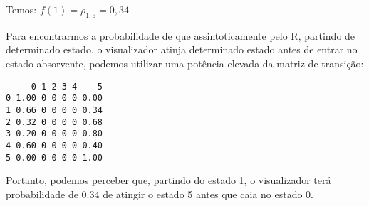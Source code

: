 \documentclass[
]{article}
\newenvironment{Shaded}{\begin{snugshade}}{\end{snugshade}}
\newcommand{\DecValTok}[1]{\textcolor[rgb]{0.00,0.00,0.81}{#1}}
\newcommand{\KeywordTok}[1]{\textcolor[rgb]{0.13,0.29,0.53}{\textbf{#1}}}
\newcommand{\NormalTok}[1]{#1}
\newcommand{\OperatorTok}[1]{\textcolor[rgb]{0.81,0.36,0.00}{\textbf{#1}}}
\newcommand{\StringTok}[1]{\textcolor[rgb]{0.31,0.60,0.02}{#1}}
\begin{document}
Temos: \(f(1)=\rho_{1,5}=0,34\)

Para encontrarmos a probabilidade de que assintoticamente pelo R,
partindo de determinado estado, o visualizador atinja determinado estado
antes de entrar no estado absorvente, podemos utilizar uma potência
elevada da matriz de transição:

\begin{Shaded}
\end{Shaded}

\begin{verbatim}
     0 1 2 3 4    5
0 1.00 0 0 0 0 0.00
1 0.66 0 0 0 0 0.34
2 0.32 0 0 0 0 0.68
3 0.20 0 0 0 0 0.80
4 0.60 0 0 0 0 0.40
5 0.00 0 0 0 0 1.00
\end{verbatim}

Portanto, podemos perceber que, partindo do estado 1, o visualizador
terá probabilidade de 0.34 de atingir o estado 5 antes que caia no
estado 0.
\end{document}
